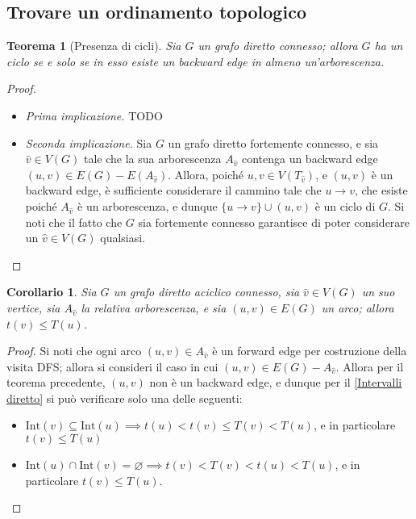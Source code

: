 \documentclass[14pt]{extreport}
\newtheorem{theorem}{Teorema}[subsection]
\newtheorem{corollary}{Corollario}[subsection]
\theoremstyle{definition}
\theoremstyle{definition}
\begin{document}
\subsection{Trovare un ordinamento topologico}

\begin{theorem}[Presenza di cicli]
    \label{Cicli diretto}
    Sia $G$ un grafo diretto connesso; allora $G$ ha un ciclo se e solo se in esso esiste un backward edge in almeno un'arborescenza.
\end{theorem}

\begin{proof}
    \hspace{0.7cm}
    \begin{itemize}
        \item[] \textit{Prima implicazione.} TODO
        \item[] \textit{Seconda implicazione.} Sia $G$ un grafo diretto fortemente connesso, e sia $\hat v \in V(G)$ tale che la sua arborescenza $A_{\hat v}$ contenga un backward edge $(u, v) \in E(G) - E(A_{\hat v})$. Allora, poiché $u, v \in V(T_{\hat v})$, e $(u, v)$ è un backward edge, è sufficiente considerare il cammino tale che $u \rightarrow v$, che esiste poiché $A_{\hat v}$ è un arborescenza, e dunque $\{u \rightarrow v\} \cup (u, v)$ è un ciclo di $G$. Si noti che il fatto che $G$ sia fortemente connesso garantisce di poter considerare un $\hat v \in V(G)$ qualsiasi.
    \end{itemize}
\end{proof}

\begin{corollary}
    Sia $G$ un grafo diretto aciclico connesso, sia $\hat v \in V(G)$ un suo vertice, sia $A_{\hat v}$ la relativa arborescenza, e sia $(u, v) \in E(G)$ un arco; allora $t(v) \le T(u)$.
\end{corollary}

\begin{proof}
    Si noti che ogni arco $(u, v) \in A_{\hat v}$ è un forward edge per costruzione della visita DFS; allora si consideri il caso in cui $(u, v) \in E(G) - A_{\hat v}$. Allora per il teorema precedente, $(u, v)$ non è un backward edge, e dunque per il \cref{Intervalli diretto} si può verificare solo una delle seguenti:
    \begin{itemize}
        \item $\mathrm{Int}(v) \subseteq \mathrm{Int}(u) \implies t(u) < t(v) \le T(v) < T(u)$, e in particolare $t(v) \le T(u)$
        \item $\mathrm{Int}(u) \cap \mathrm{Int}(v) = \varnothing \implies t(v) < T(v) < t(u) < T(u)$, e in particolare $t(v) \le T(u)$.
    \end{itemize}
\end{proof}
\end{document}
